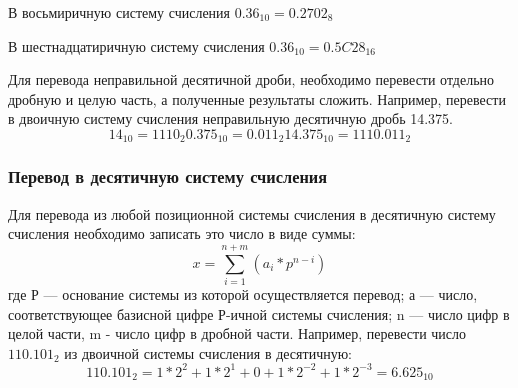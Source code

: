 В восьмиричную систему счисления $0.36_{10}=0.2702_{8}$

\begin{figure}[h]
\end{figure}

В шестнадцатиричную систему счисления $0.36_{10}=0.5C28_{16}$

\begin{figure}[h]
\end{figure}

Для перевода неправильной десятичной дроби, необходимо перевести отдельно дробную и целую часть, а полученные результаты сложить. Например, перевести в двоичную систему счисления неправильную десятичную дробь 14.375.
$$14_{10}=1110_{2} 0.375_{10}=0.011_{2} 14.375_{10}=1110.011_{2}$$

\subsubsection{Перевод в десятичную систему счисления}
Для перевода из любой позиционной системы счисления в десятичную систему счисления необходимо записать это число в виде суммы:
$$x = \sum^{n+m}_{i=1}(a_{i}*p^{n-i})$$
где Р --- основание системы из которой осуществляется перевод;\newline
а --- число, соответствующее базисной цифре Р-ичной системы счисления;\newline
n --- число цифр в целой части, m - число цифр в дробной части.\newline
Например, перевести число $110.101_{2}$ из двоичной системы счисления в десятичную:
$$110.101_{2} = 1 * 2^{2} + 1 * 2^{1} + 0 + 1 * 2^{-2} + 1 * 2^{-3} = 6.625_{10}$$

